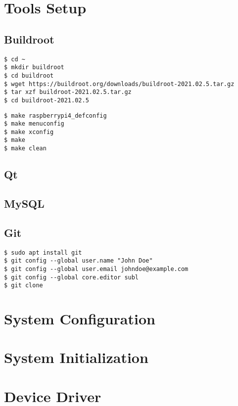 \section{Tools Setup}

\subsection{Buildroot}
\begin{lstlisting}
$ cd ~
$ mkdir buildroot
$ cd buildroot
$ wget https://buildroot.org/downloads/buildroot-2021.02.5.tar.gz
$ tar xzf buildroot-2021.02.5.tar.gz
$ cd buildroot-2021.02.5
\end{lstlisting}

\begin{lstlisting}
$ make raspberrypi4_defconfig
$ make menuconfig
$ make xconfig
$ make 
$ make clean
\end{lstlisting}

\subsection{Qt}

\subsection{MySQL}

\subsection{Git}
\begin{lstlisting}
$ sudo apt install git
$ git config --global user.name "John Doe"
$ git config --global user.email johndoe@example.com
$ git config --global core.editor subl
$ git clone 
\end{lstlisting}

\section{System Configuration}

\clearpage
\section{System Initialization}

\clearpage
\section{Device Driver}